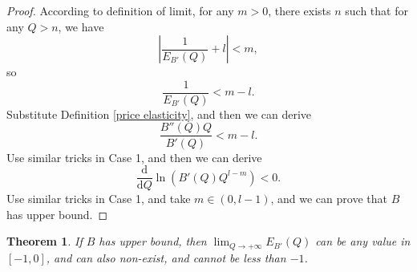 \documentclass{article}
\newtheorem{theorem}{Theorem}[subsection]
\begin{document}
\begin{proof}
According to definition of limit, for any $m>0$, there exists $n$ such that for any $Q>n$, we have
$$\left|\frac1{E_{B'}\!\left(Q\right)}+l\right|<m,$$
so
$$\frac1{E_{B'}\!\left(Q\right)}<m-l.$$
Substitute Definition \ref{price elasticity}, and then we can derive
$$\frac{B''\!\left(Q\right)Q}{B'\!\left(Q\right)}<m-l.$$
Use similar tricks in Case 1, and then we can derive
$$\frac{\mathrm d}{\mathrm dQ}\ln\!\left(B'\!\left(Q\right)Q^{l-m}\right)<0.$$
Use similar tricks in Case 1, and take $m\in\left(0,l-1\right)$,
and we can prove that $B$ has upper bound.
\end{proof}

\begin{theorem}
If $B$ has upper bound, then $\lim_{Q\to+\infty}E_{B'}\!\left(Q\right)$ can be any value in $\left[-1,0\right]$, and can also non-exist, and cannot be less than $-1$.
\end{theorem}
\end{document}

